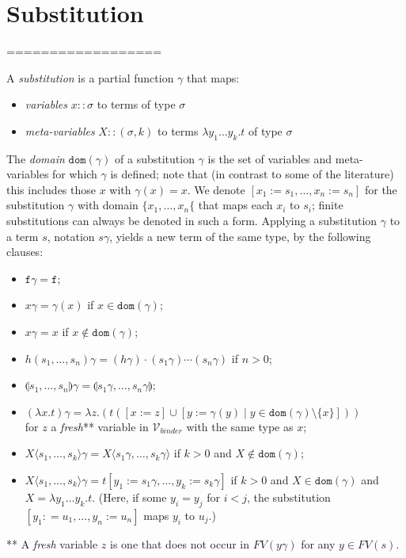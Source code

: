 \documentclass{lmcs}
\theoremstyle{theorem}\newtheorem{theorem}{Theorem}
\theoremstyle{theorem}\newtheorem{lemma}[theorem]{Lemma}
\theoremstyle{theorem}\newtheorem{corollary}[theorem]{Corollary}
\theoremstyle{definition}\newtheorem{definition}[theorem]{Definition}
\theoremstyle{definition}\newtheorem{example}[theorem]{Example}
\newcommand{\Vbound}{\mathcal{V}_{\mathit{binder}}}
\newcommand{\FV}{\mathit{FV}}
\newcommand{\domain}{\mathtt{dom}}
\newcommand{\atype}{\sigma}
\newcommand{\identifier}[1]{\mathtt{#1}}
\newcommand{\afun}{\identifier{f}}
\newcommand{\avar}{x}
\newcommand{\bvar}{y}
\newcommand{\cvar}{z}
\newcommand{\Avar}{X}
\newcommand{\abs}[2]{\lambda #1.#2}
\newcommand{\meta}[2]{#1\langle#2\rangle}
\newcommand{\tuple}[2]{\llparenthesis #1,\dots,#2 \rrparenthesis}
\begin{document}
\section{Substitution}

==================

A \emph{substitution} is a partial function $\gamma$ that maps:
\begin{itemize}
\item \emph{variables} $\avar :: \atype$ to terms of type $\atype$
\item \emph{meta-variables} $\Avar :: (\atype,k)$ to terms $\abs{\bvar_1 \dots
  \bvar_k}{t}$ of type $\atype$
\end{itemize}
The \emph{domain} $\domain(\gamma)$ of a substitution $\gamma$ is the set of
variables and meta-variables for which $\gamma$ is defined; note that (in
contrast to some of the literature) this includes those $\avar$ with
$\gamma(\avar) = \avar$.
We denote $[x_1:=s_1,\dots,x_n:=s_n]$ for the substitution $\gamma$ with
domain $\{x_1,\dots,x_n\{$ that maps each $x_i$ to $s_i$; finite substitutions
can always be denoted in such a form.
Applying a substitution $\gamma$ to a term $s$, notation $s\gamma$, yields a
new term of the same type, by the following clauses:

\begin{itemize}
\item $\afun\gamma = \afun$;
\item $\avar\gamma = \gamma(\avar)$ if $\avar \in \domain(\gamma)$;
\item $\avar\gamma = \avar$ if $\avar \notin \domain(\gamma)$;
\item $h(s_1,\dots,s_n)\gamma = (h\gamma) \cdot (s_1\gamma) \cdots (s_n\gamma)$
  if $n > 0$;
\item $\tuple{s_1}{s_n}\gamma = \tuple{s_1\gamma}{s_n\gamma}$;
\item $(\abs{\avar}{t})\gamma = \abs{\cvar}{(t ([\avar:=\cvar] \cup [\bvar:=
  \gamma(\bvar) \mid \bvar \in \domain(\gamma) \setminus \{\avar\}]))}$ \\
  for $\cvar$ a \emph{fresh}** variable in $\Vbound$ with the same type as
  $\avar$;
\item $\meta{\Avar}{s_1,\dots,s_k}\gamma = \meta{\Avar}{s_1\gamma,\dots,s_k
  \gamma}$ if $k > 0$ and $\Avar \notin \domain(\gamma)$;
\item $\meta{\Avar}{s_1,\dots,s_k}\gamma = t[\bvar_1:=s_1\gamma,\dots,\bvar_k:=
  s_k\gamma]$ if $k > 0$ and $\Avar \in \domain(\gamma)$ and $\Avar =
  \abs{\bvar_1 \dots \bvar_k}{t}$.
  (Here, if some $\bvar_i = \bvar_j$ for $i < j$, the substitution $[\bvar_1:
  =u_1,\dots,\bvar_n:=u_n]$ maps $\bvar_i$ to $u_j$.)
\end{itemize}
** A \emph{fresh} variable $\cvar$ is one that does not occur in
$\FV(\bvar\gamma)$ for any $\bvar \in \FV(s)$.
\end{document}
